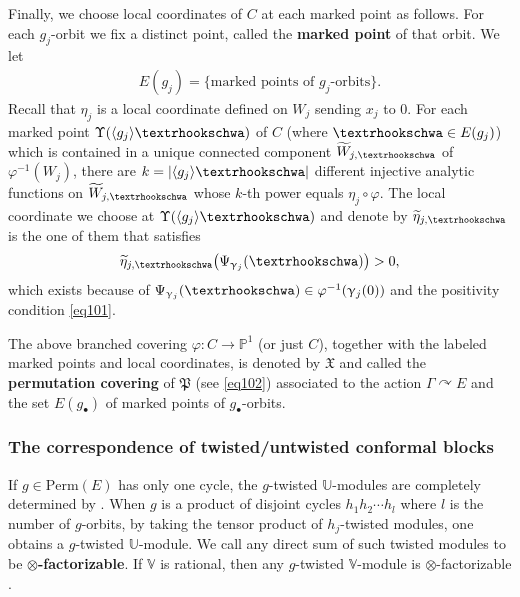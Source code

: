 \documentclass[12pt,a4paper,notitlepage]{article}
\theoremstyle{definition}
\theoremstyle{plain}
\newcommand{\fk}{\mathfrak}
\newcommand{\mc}{\mathcal}
\newcommand{\wtd}{\widetilde}
\newcommand{\bk}[1]{\langle {#1}\rangle}
\newcommand{\blt}{\bullet}
\newcommand{\Vbb}{\mathbb V}
\newcommand{\Ubb}{\mathbb U}
\newcommand{\Cbb}{\mathbb C}
\newcommand{\Pbb}{\mathbb P}
\newcommand{\Perm}{\mathrm{Perm}}
\newcommand{\tipae}{\text{\textrhookschwa}}
\numberwithin{equation}{subsection}
\begin{document}
Finally, we choose local coordinates of $C$ at each marked point as follows. For each $g_j$-orbit we fix a distinct point, called the \textbf{marked point} of that orbit. We let 
\begin{align*}
	E(g_j)=\{\text{marked points of $g_j$-orbits}\}.
\end{align*}
Recall that $\eta_j$ is a local coordinate defined on $W_j$ sending $x_j$ to $0$. For each marked point $\Upsilon(\bk{g_j}\tipae)$ of $C$ (where $\tipae\in E(g_j)$) which is contained in a unique connected component $\wtd W_{j,\tipae}$ of $\varphi^{-1}(W_j)$, there are $k=|\bk{g_j}\tipae|$ different injective analytic functions on $\wtd W_{j,\tipae}$ whose $k$-th power equals $\eta_j\circ\varphi$. The local coordinate we choose at $\Upsilon(\bk{g_j}\tipae)$ and denote by $\wtd\eta_{j,\tipae}$ is the one of them that satisfies
\begin{align*}
\wtd\eta_{j,\tipae}\big(\Psi_{\upgamma_j}(\tipae)\big)>0,	
\end{align*}
which exists because of $\Psi_{\upgamma_j}(\tipae)\in\varphi^{-1}(\upgamma_j(0))$ and the positivity condition \eqref{eq101}.

The above branched covering $\varphi:C\rightarrow\Pbb^1$ (or just $C$), together with the labeled marked points and local coordinates, is denoted by $\fk X$ and called the \textbf{permutation covering} of  $\fk P$ (see \eqref{eq102}) associated to the action $\Gamma\curvearrowright E$ and the set $E(g_\blt)$ of marked points of $g_\blt$-orbits.



\subsubsection*{The correspondence of twisted/untwisted conformal blocks}

If $g\in\Perm(E)$ has only one cycle, the $g$-twisted $\Ubb$-modules are completely determined by \cite{BDM02}. When $g$ is a product of disjoint cycles $h_1h_2\cdots h_l$ where $l$ is the number of $g$-orbits, by taking the tensor product of $h_j$-twisted modules, one obtains a $g$-twisted $\Ubb$-module. We call any direct sum of such twisted modules  to be \textbf{$\otimes$-factorizable}. If $\Vbb$ is rational, then any $g$-twisted $\Vbb$-module is $\otimes$-factorizable \cite[Thm. 6.4]{BDM02}.

\end{document}
